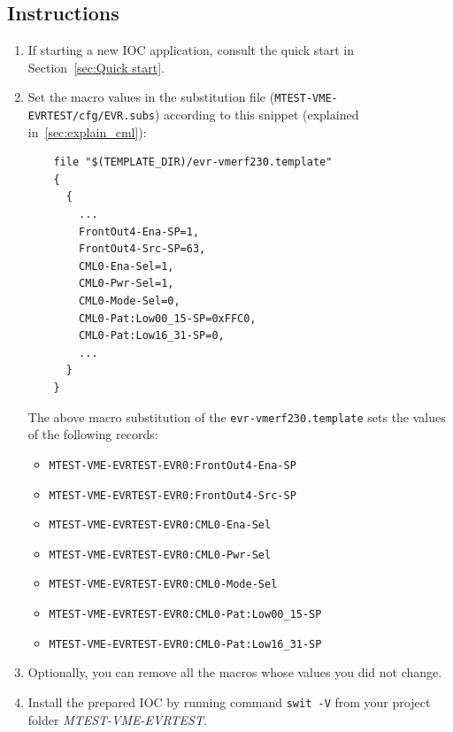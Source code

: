 \documentclass[12pt,a4paper]{article}
\begin{document}
\subsection{Instructions}
\begin{enumerate}
	\item If starting a new IOC application, consult the quick start in Section~\ref{sec:Quick start}.
	
	\item Set the macro values in the substitution file (\texttt{MTEST-VME-EVRTEST/cfg/EVR.subs}) according to this snippet (explained in~\ref{sec:explain_cml}):
\begin{verbatim}
	file "$(TEMPLATE_DIR)/evr-vmerf230.template"
	{
	  {
	    ...
	    FrontOut4-Ena-SP=1,
	    FrontOut4-Src-SP=63,
	    CML0-Ena-Sel=1,
	    CML0-Pwr-Sel=1,
	    CML0-Mode-Sel=0,
	    CML0-Pat:Low00_15-SP=0xFFC0,
	    CML0-Pat:Low16_31-SP=0, 
	    ...
	  }
	}
\end{verbatim}
	The above macro substitution of the \texttt{evr-vmerf230.template} sets the values of the following records:
	\begin{itemize}
		\item \texttt{MTEST-VME-EVRTEST-EVR0:FrontOut4-Ena-SP}
		\item \texttt{MTEST-VME-EVRTEST-EVR0:FrontOut4-Src-SP}
		\item \texttt{MTEST-VME-EVRTEST-EVR0:CML0-Ena-Sel}
		\item \texttt{MTEST-VME-EVRTEST-EVR0:CML0-Pwr-Sel}
		\item \texttt{MTEST-VME-EVRTEST-EVR0:CML0-Mode-Sel}
		\item \texttt{MTEST-VME-EVRTEST-EVR0:CML0-Pat:Low00\_15-SP}
		\item \texttt{MTEST-VME-EVRTEST-EVR0:CML0-Pat:Low16\_31-SP}
	\end{itemize}

	\item Optionally, you can remove all the macros whose values you did not change. 
	\item Install the prepared IOC by running command \texttt{swit -V} from your project folder \textit{MTEST-VME-EVRTEST}.
\end{enumerate}
\end{document}
